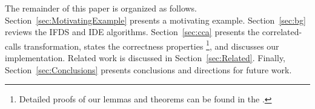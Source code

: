 The remainder of this paper is organized as follows.
Section~\ref{sec:MotivatingExample} presents a motivating example.
Section~\ref{sec:bg} reviews the IFDS and IDE algorithms.
Section~\ref{sec:cca} presents the correlated-calls transformation, 
states the correctness properties%
\footnote{
  Detailed proofs of our lemmas and theorems can be found in
  the \reportOrAppendix.
}, and discusses our implementation.
Related work is discussed in Section~\ref{sec:Related}.
Finally, Section~\ref{sec:Conclusions} presents conclusions and directions for future work.

 
 
